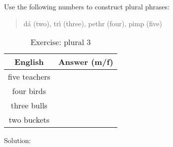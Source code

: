 Use the following numbers to construct plural phrases:\\
\begin{quote}
d\'{a} (two), tr\'{\i} (three), pethr (four), pimp (five)
\end{quote}

\begin{table}[H]
\centering
\begin{tabular}{|c|M{10.0cm}|}
  \toprule
  \textbf{English} & \textbf{Answer (m/f)}\\
  \toprule
  five teachers & \\
  \midrule
  four birds & \\
  \midrule
  three bulls & \\
  \midrule
  two buckets & \\
  \bottomrule
\end{tabular}
\label{exercise_plural_3}
\caption{Exercise: plural 3}
\end{table}

\newpage
Solution:
\begin{table}[H]
\centering
\label{solution_plural_3}
\caption{Solution: plural 3}
\end{table}

